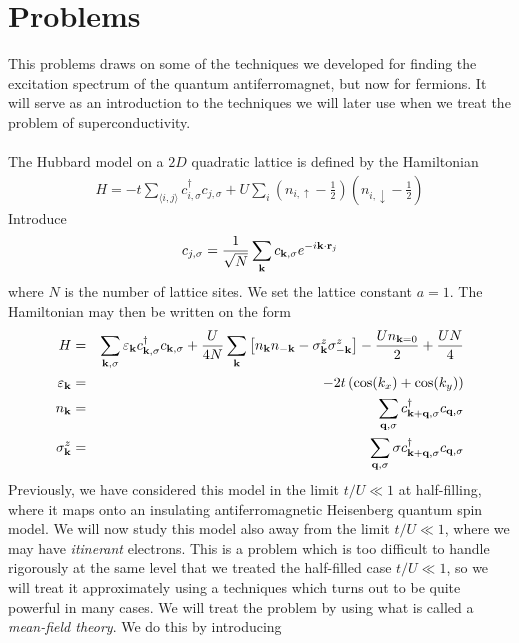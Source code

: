 \section*{Problems}

\begin{problem}
	
This problems draws on some of the techniques we developed for finding the excitation spectrum of the quantum antiferromagnet, but now for  fermions. It will serve as an introduction to the techniques we will later use when we treat the problem of superconductivity. 
\ \\
\ \\
The Hubbard model on a $2D$ quadratic lattice  is defined by the Hamiltonian
\begin{eqnarray}
	H = -t \sum_{\langle i,j \rangle} c^{\dagger}_{i,\sigma} c_{j,\sigma} + 
	U \sum_i   \left( n_{i, \uparrow} -\frac{1}{2} \right) \left(   n_{i, \downarrow}  -\frac{1}{2} \right) \nonumber
\end{eqnarray}
Introduce 
\begin{eqnarray}
	c_{j,\sigma} = \frac{1}{\sqrt{N}} \sum_{{\bf k}} c_{{\bf k},\sigma} e^{- i {\bf k} \cdot {\bf r}_j} \nonumber
\end{eqnarray}
where $N$ is the number of lattice sites. We set the lattice constant $a=1$. The Hamiltonian may then be written on the form
\begin{eqnarray}
	H &  = & \sum_{{\bf k},\sigma} \varepsilon_{{\bf k}} c^{\dagger}_{{\bf k},\sigma} c_{{\bf k},\sigma} + \frac{U}{4N} \sum_{{\bf k}} 
	\left[ n_{\bf k}  n_{-\bf k}  - \sigma^z_{\bf k}  \sigma^z_{-\bf k}  \right]  
	- \frac{U n_{{\bf k}=0}}{2} 
	+\frac{U N}{4}
	\nonumber \\
	\varepsilon_{{\bf k}} & = & - 2 t \left(  \cos(k_x) + \cos(k_y) \right) \nonumber  \\
	n_{\bf k} & = &  \sum_{{\bf q}, \sigma} c^{\dagger}_{{\bf k} + {\bf q},\sigma}  c_{{\bf q},\sigma} \nonumber \\
	\sigma^z_{\bf k} & = &  \sum_{{\bf q}, \sigma} \sigma c^{\dagger}_{{\bf k} + {\bf q},\sigma}  c_{{\bf q},\sigma} \nonumber 
\end{eqnarray} 
Previously, we have considered this model in the limit $t/U \ll 1$ at half-filling, where it maps onto an insulating antiferromagnetic Heisenberg quantum spin model. We will now study this model also away from the limit $t/U \ll 1$, where we may have {\it itinerant} electrons. This is a problem which is too difficult to handle rigorously at the same level that we treated the half-filled case $t/U \ll 1$, so we will treat it approximately using a techniques which turns out to be quite powerful in many cases.  We will treat the problem by using what is called a {\it mean-field theory}. We do this by introducing 

\end{problem}
